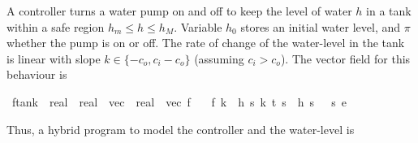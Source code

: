 \documentclass[envcountsame,envcountsect]{llncs}
\begin{document}
\begin{example}\label{ex:tank-inv}
  A controller turns a water pump on and off to keep the level of
  water $h$ in a tank within a safe region $h_m\leq h\leq h_M$.
  Variable $h_0$ stores an initial water level, and $\pi$ whether
  the pump is on or off. The rate of change of the water-level in the
  tank is linear with slope $k\in\{-c_o,c_i-c_o\}$ (assuming
  $c_i>c_o$). The vector field for this behaviour is
\begin{isabellebody}
\isanewline
{}\isamarkupfalse%
\ ftank\ {\isacharcolon}{\isacharcolon}\ {\isachardoublequoteopen}real\ {\isasymRightarrow}\ {\isacharparenleft}real{\isacharcomma}\ {}{\isacharparenright}\ vec\ {\isasymRightarrow}\ {\isacharparenleft}real{\isacharcomma}\ {}{\isacharparenright}\ vec{\isachardoublequoteclose}\ {\isacharparenleft}{\isachardoublequoteopen}f{\isachardoublequoteclose}{\isacharparenright}\isanewline
\ \ \ {\isachardoublequoteopen}f\ k\ {\isasymequiv}\ {\isasymlbrakk}{\isacharbrackleft}h\ {\isasymmapsto}\isactrlsub s\ k{\isacharcomma}\ t\ {\isasymmapsto}\isactrlsub s\ {}{\isacharcomma}\ h\ {\isasymmapsto}\isactrlsub s\ {}{\isacharcomma}\ {\isasympi}\ {\isasymmapsto}\isactrlsub s\ {}{\isacharbrackright}{\isasymrbrakk}\isactrlsub e{\isachardoublequoteclose}\isanewline
\end{isabellebody}
\noindent Thus, a hybrid program to model the controller and the
water-level is


\end{example}
\end{document}
